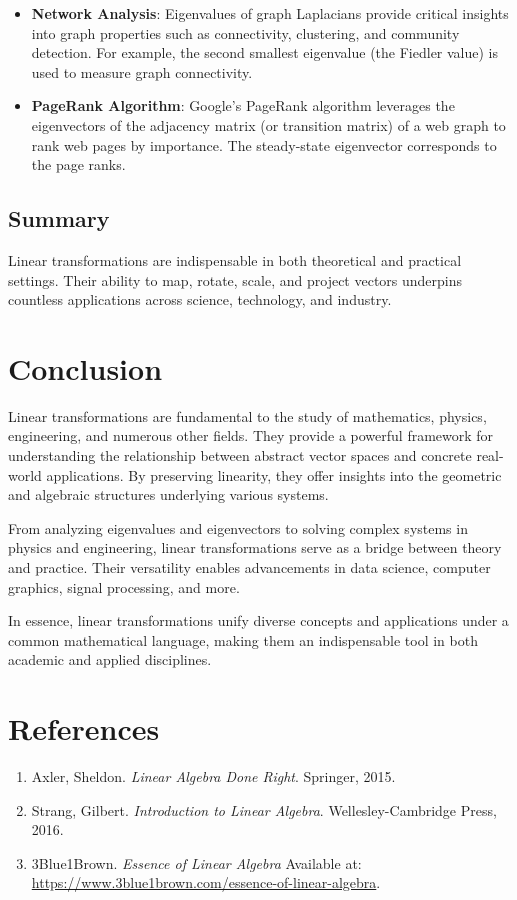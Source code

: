 \documentclass[11pt]{article}
\begin{document}
\begin{itemize}
    \item \textbf{Network Analysis}:
    Eigenvalues of graph Laplacians provide critical insights into graph properties such as connectivity, clustering, and community detection. For example, the second smallest eigenvalue (the Fiedler value) is used to measure graph connectivity.

    \item \textbf{PageRank Algorithm}:
    Google's PageRank algorithm leverages the eigenvectors of the adjacency matrix (or transition matrix) of a web graph to rank web pages by importance. The steady-state eigenvector corresponds to the page ranks.
\end{itemize}


\subsection*{Summary}
Linear transformations are indispensable in both theoretical and practical settings. Their ability to map, rotate, scale, and project vectors underpins countless applications across science, technology, and industry.


\section{\textbf{Conclusion}}  

Linear transformations are fundamental to the study of mathematics, physics, engineering, and numerous other fields. They provide a powerful framework for understanding the relationship between abstract vector spaces and concrete real-world applications. By preserving linearity, they offer insights into the geometric and algebraic structures underlying various systems.

From analyzing eigenvalues and eigenvectors to solving complex systems in physics and engineering, linear transformations serve as a bridge between theory and practice. Their versatility enables advancements in data science, computer graphics, signal processing, and more.

In essence, linear transformations unify diverse concepts and applications under a common mathematical language, making them an indispensable tool in both academic and applied disciplines.



\section*{References}

\begin{enumerate}
    \item Axler, Sheldon. \textit{Linear Algebra Done Right}. Springer, 2015.
    \item Strang, Gilbert. \textit{Introduction to Linear Algebra}. Wellesley-Cambridge Press, 2016.
    \item 3Blue1Brown. \textit{Essence of Linear Algebra} Available at: 
    \href{https://www.3blue1brown.com/essence-of-linear-algebra}{https://www.3blue1brown.com/essence-of-linear-algebra}.
\end{enumerate}

	
\end{document}
